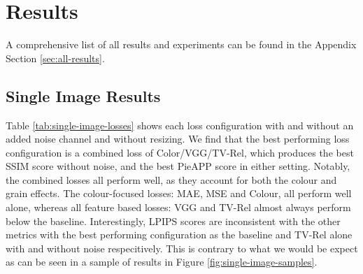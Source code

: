 
\section{Results}
\label{sec:results}




A comprehensive list of all results and experiments can be found in the Appendix Section \ref{sec:all-results}.

\subsection{Single Image Results}


Table \ref{tab:single-image-losses} shows each loss configuration with and without an added noise channel and without resizing. We find that the best performing loss configuration is a combined loss of Color/VGG/TV-Rel, which produces the best SSIM score without noise, and the best PieAPP score in either setting. Notably, the combined losses all perform well, as they account for both the colour and grain effects. The colour-focused losses: MAE, MSE and Colour, all perform well alone, whereas all feature based losses: VGG and TV-Rel almost always perform below the baseline. Interestingly, LPIPS scores are inconsistent with the other metrics with the best performing configuration as the baseline and TV-Rel alone with and without noise respecitively. This is contrary to what we would be expect as can be seen in a sample of results in Figure \ref{fig:single-image-samples}.

